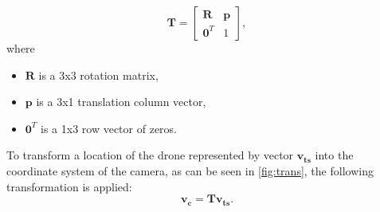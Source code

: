 \documentclass[twoside]{ctuthesis}
\theoremstyle{plain}
\theoremstyle{definition}
\theoremstyle{note}
\begin{document}
\begin{equation}
	\textbf{T}=\begin{bmatrix}
		\textbf{R} & \textbf{p}\\
		\textbf{0}^T & 1
	\end{bmatrix},
\end{equation}
where
\begin{itemize}
	\item $\textbf{R}$ is a 3x3 rotation matrix,
	\item $\textbf{p}$ is a 3x1 translation column vector,
	\item $\textbf{0}^T$ is a 1x3 row vector of zeros.
\end{itemize}
To transform a location of the drone represented by vector $\mathbf{v_{ts}}$ into the coordinate system of the camera, as can be seen in \autoref{fig:trans}, the following transformation is applied:
\begin{equation}
	\mathbf{v_c}=\mathbf{T}\mathbf{v_{ts}}.
\end{equation}
\end{document}
